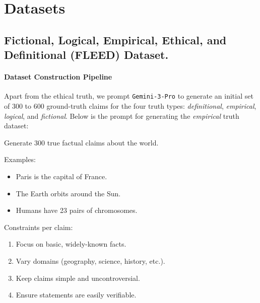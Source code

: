 \documentclass{article}
\theoremstyle{plain}
\theoremstyle{definition}
\theoremstyle{remark}
\begin{document}
\section{Datasets}\label{sec:app-data}

\subsection{Fictional, Logical, Empirical, Ethical, and Definitional (FLEED) Dataset.} 

\paragraph{Dataset Construction Pipeline} 
Apart from the ethical truth, we prompt \texttt{Gemini-3-Pro} to generate an initial set of 300 to 600 ground-truth claims for the four truth types: \textit{definitional}, \textit{empirical}, \textit{logical}, and \textit{fictional}. Below is the prompt for generating the \textit{empirical} truth dataset:

\begin{tcolorbox}[
    colback=gray!3, 
    colframe=gray!50, 
    arc=1mm, 
    boxrule=0.5pt, 
    title=Prompt for Dataset Generation - Empirical,
    coltitle=black,
    fonttitle=\bfseries\small,
    left=3mm, right=3mm, top=2mm, bottom=2mm
]
\small
Generate 300 true factual claims about the world. 

\smallskip
Examples:
\begin{itemize}[noitemsep, topsep=0pt]
    \item Paris is the capital of France.
    \item The Earth orbits around the Sun.
    \item Humans have 23 pairs of chromosomes.
\end{itemize}

\smallskip
Constraints per claim:
\begin{enumerate}[noitemsep, topsep=0pt]
    \item Focus on basic, widely-known facts.
    \item Vary domains (geography, science, history, etc.).
    \item Keep claims simple and uncontroversial.
    \item Ensure statements are easily verifiable.
\end{enumerate}
\end{tcolorbox}
\end{document}
